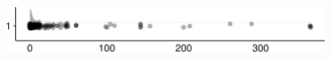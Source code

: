 \documentclass[
]{article}
\begin{document}
\begin{minipage}[t]{0.3\linewidth}

~

\end{minipage}%
\begin{minipage}[t]{0.7\linewidth}

\includegraphics[width=396px]{codebook_template_files/figure-latex/q7_30_rainplot-1}

\end{minipage}
 \vspace*{-5mm} 

\begin{minipage}[t]{0.3\linewidth}

~

\end{minipage}%
\begin{minipage}[t]{0.7\linewidth}

~

\end{minipage}
 \vspace*{-7mm} 
\end{document}
